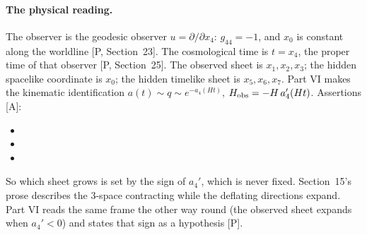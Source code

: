 \paragraph{The physical reading.} The observer is the geodesic observer $u=\partial/\partial x_4$:
$g_{44}=-1$, and $x_0$ is constant along the worldline [P, Section~23]. The cosmological time
is $t=x_4$, the proper time of that observer [P, Section~25]. The observed sheet is $x_1,x_2,x_3$; the hidden spacelike coordinate is $x_0$;
the hidden timelike sheet is $x_5,x_6,x_7$. Part VI makes the kinematic identification
$a(t)\sim q\sim e^{-a_4(Ht)}$, $H_{\rm obs}=-H\,a_4'(Ht)$. Assertions [A]:
\begin{itemize}
  \item {}
  \item {}
  \item {}
\end{itemize}
So which sheet grows is set by the sign of $a_4'$, which is never fixed. Section~15's prose
describes the 3-space contracting while the deflating directions expand. Part VI reads the same
frame the other way round (the observed sheet expands when $a_4'<0$) and states that sign as a
hypothesis [P].

